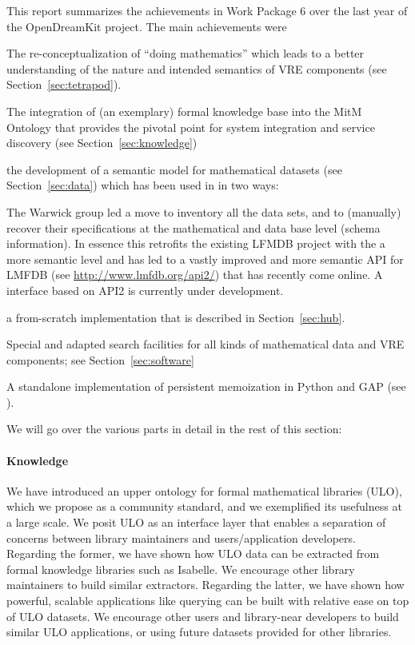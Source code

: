 This report summarizes the achievements in Work Package 6 over the last year of the OpenDreamKit project. The main achievements were
\begin{compactenum}
\item The re-conceptualization of ``doing mathematics'' which leads to a better understanding of the nature and intended semantics of VRE components (see Section~\ref{sec:tetrapod}).
\item The integration of (an exemplary) formal knowledge base into the MitM Ontology that provides the pivotal point for system integration and service discovery (see Section~\ref{sec:knowledge})  
\item the development of a semantic model for mathematical datasets (see Section~\ref{sec:data}) which has been used in  in two ways: 
  \begin{compactitem}
  \item The Warwick group led a move to inventory all the data sets, and to (manually) recover their specifications at the mathematical and data base level (schema information).
    In essence this retrofits the existing LFMDB project with the a more semantic level and has led to a vastly improved and more semantic API for LMFDB (see \url{http://www.lmfdb.org/api2/}) that has recently come online.
    A \Sage interface based on API2 is currently under development.
  \item a from-scratch implementation \dmh  that is described in Section~\ref{sec:hub}.
  \end{compactitem}
\item Special and adapted search facilities for all kinds of mathematical data and VRE components; see Section~\ref{sec:software}
\item A standalone implementation of persistent memoization in Python and GAP (see ).
\end{compactenum}
We will go over the various parts in detail in the rest of this section:

\paragraph{Knowledge}
We have introduced an upper ontology for formal mathematical libraries (ULO), which we propose as a community standard, and we exemplified its usefulness at a large scale.
We posit ULO as an interface layer that enables a separation of concerns between library maintainers and users/application developers.
Regarding the former, we have shown how ULO data can be extracted from formal knowledge libraries such as Isabelle.
We encourage other library maintainers to build similar extractors.
Regarding the latter, we have shown how powerful, scalable applications like querying can be built with relative ease on top of ULO datasets.
We encourage other users and library-near developers to build similar ULO applications, or using future datasets provided for other libraries.

